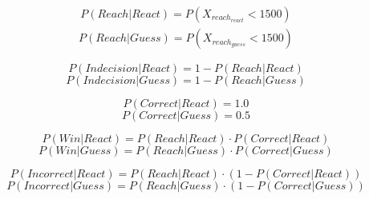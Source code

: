 \documentclass[12pt,letterpaper]{article}
\begin{document}
\begin{align}
    P(Reach|React) = P(X_{reach_{react}} < 1500)
\end{align}
\begin{align}
    P(Reach|Guess) = P(X_{reach_{guess}} < 1500)
\end{align}

\begin{equation}
    P(Indecision|React) = 1 - P(Reach|React)
\end{equation}
\begin{equation}
    P(Indecision|Guess) = 1 - P(Reach|Guess)
\end{equation}

\begin{equation}
    P(Correct|React) = 1.0
\end{equation}
\begin{equation}
    P(Correct|Guess) = 0.5
\end{equation}


\begin{equation}
    P(Win|React) = P(Reach|React) \cdot P(Correct|React)
\end{equation}
\begin{equation}
    P(Win|Guess) = P(Reach|Guess) \cdot P(Correct|Guess)
\end{equation}


\begin{equation}
    P(Incorrect|React) = P(Reach|React) \cdot (1 - P(Correct|React))
\end{equation}
\begin{equation}
    P(Incorrect|Guess) = P(Reach|Guess) \cdot (1 - P(Correct|Guess))
\end{equation}






\end{document}
